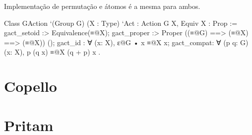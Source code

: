 Implementação de permutação e átomos é a mesma para ambos.

\begin{coqcode}
	Class GAction `(Group G) (X : Type) `{Act : Action G X, Equiv X} : Prop := {
		gact_setoid :> Equivalence(≡@{X});
		gact_proper :> Proper ((≡@{G}) ==> (≡@{X}) ==> (≡@{X})) ();
		gact_id : ∀ (x: X), ε@{G} • x ≡@{X} x;
		gact_compat: ∀ (p q: G) (x: X), p  (q  x) ≡@{X} (q + p)  x
	}.
\end{coqcode}

\section{Copello}
\section{Pritam}